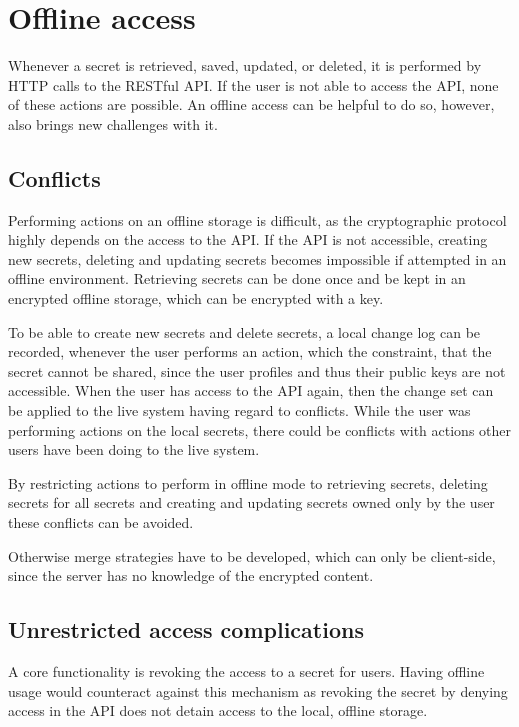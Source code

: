 \section{Offline access}

Whenever a secret is retrieved, saved, updated, or deleted, it is performed by
HTTP calls to the RESTful API. If the user is not able to access the API, none
of these actions are possible. An offline access can be helpful to do so, however,
also brings new challenges with it.

\subsection{Conflicts}

Performing actions on an offline storage is difficult, as the cryptographic
protocol highly depends on the access to the API. If the API is not accessible,
creating new secrets, deleting and updating secrets becomes impossible if
attempted in an offline environment. Retrieving secrets can be done once and be
kept in an encrypted offline storage, which can be encrypted with a key.

To be able to create new secrets and delete secrets, a local change log can be
recorded, whenever the user performs an action, which the constraint, that the
secret cannot be shared, since the user profiles and thus their public keys are
not accessible. When the user has access to the API again, then the change set
can be applied to the live system having regard to conflicts. While the user
was performing actions on the local secrets, there could be conflicts with
actions other users have been doing to the live system.

By restricting actions to perform in offline mode to retrieving secrets,
deleting secrets for all secrets and creating and updating secrets owned only
by the user these conflicts can be avoided.

Otherwise merge strategies have to be developed, which can only be client-side,
since the server has no knowledge of the encrypted content.

\subsection{Unrestricted access complications}
\label{sub_sec:unrestricted_access}

A core functionality is revoking the access to a secret for users. Having
offline usage would counteract against this mechanism as revoking the secret by
denying access in the API does not detain access to the local, offline storage.

